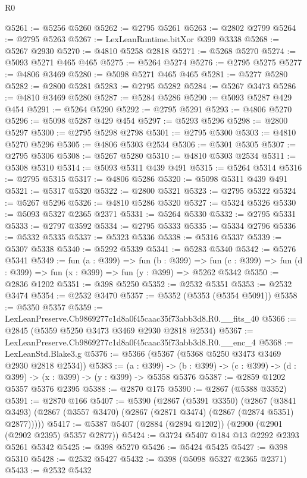 \begin{lexlean}{R0}
\begin{coremodule}
@5261 := @5256 @5260
@5262 := @2795 @5261
@5263 := @2802 @2799
@5264 := @2795 @5263
@5267 := LexLeanRuntime.bitXor @399 @3338
@5268 := @5267 @2930
@5270 := @4810 @5258 @2818
@5271 := @5268 @5270
@5274 := @5093 @5271 @465 @465
@5275 := @5264 @5274
@5276 := @2795 @5275
@5277 := @4806 @3469
@5280 := @5098 @5271 @465 @465
@5281 := @5277 @5280
@5282 := @2800 @5281
@5283 := @2795 @5282
@5284 := @5267 @3473
@5286 := @4810 @3469 @5280
@5287 := @5284 @5286
@5290 := @5093 @5287 @429 @454
@5291 := @5264 @5290
@5292 := @2795 @5291
@5293 := @4806 @5270
@5296 := @5098 @5287 @429 @454
@5297 := @5293 @5296
@5298 := @2800 @5297
@5300 := @2795 @5298 @2798
@5301 := @2795 @5300
@5303 := @4810 @5270 @5296
@5305 := @4806 @5303 @2534
@5306 := @5301 @5305
@5307 := @2795 @5306
@5308 := @5267 @5280
@5310 := @4810 @5303 @2534
@5311 := @5308 @5310
@5314 := @5093 @5311 @439 @491
@5315 := @5264 @5314
@5316 := @2795 @5315
@5317 := @4806 @5286
@5320 := @5098 @5311 @439 @491
@5321 := @5317 @5320
@5322 := @2800 @5321
@5323 := @2795 @5322
@5324 := @5267 @5296
@5326 := @4810 @5286 @5320
@5327 := @5324 @5326
@5330 := @5093 @5327 @2365 @2371
@5331 := @5264 @5330
@5332 := @2795 @5331
@5333 := @2797 @3592
@5334 := @2795 @5333
@5335 := @5334 @2796
@5336 := @5332 @5335
@5337 := @5323 @5336
@5338 := @5316 @5337
@5339 := @5307 @5338
@5340 := @5292 @5339
@5341 := @5283 @5340
@5342 := @5276 @5341
@5349 := fun (a : @399) =>
  fun (b : @399) =>
  fun (c : @399) => fun (d : @399) => fun (x : @399) => fun (y : @399) => @5262 @5342
@5350 := @2836 @1202
@5351 := @398 @5250
@5352 := @2532 @5351
@5353 := @2532 @3474
@5354 := @2532 @3470
@5357 := @5352 (@5353 (@5354 @5091))
@5358 := @5350 @5357
@5359 := LexLeanPreserve.Cb9869277c1d8a0f45caac35f73abb3d8.R0.__fits_40
@5366 := @2845 (@5359 @5250 @3473 @3469 @2930 @2818 @2534)
@5367 := LexLeanPreserve.Cb9869277c1d8a0f45caac35f73abb3d8.R0.__enc_4
@5368 := LexLeanStd.Blake3.g
@5376 := @5366 (@5367 (@5368 @5250 @3473 @3469 @2930 @2818 @2534))
@5383 := (a : @399) ->
  (b : @399) -> (c : @399) -> (d : @399) -> (x : @399) -> (y : @399) -> @5358 @5376
@5387 := @2859 @1202 @5357 @5376 @2395
@5388 := @2870 @175
@5390 := @2867 (@5388 @3352)
@5391 := @2870 @166
@5407 := @5390
    (@2867
      (@5391 @3350)
      (@2867 (@3841 @3493) (@2867 (@3557 @3470) (@2867 (@2871 @3474) (@2867 (@2874 @5351) @2877)))))
@5417 := @5387 @5407 (@2884 (@2894 @1202)) (@2900 (@2901 (@2902 @2395) @5357 @2877))
@5424 := @3724 @5407 @184 @13 @2292 @2393 @5261 @5342
@5425 := @398 @5270
@5426 := @5424 @5425
@5427 := @398 @5310
@5428 := @2532 @5427
@5432 := @398 (@5098 @5327 @2365 @2371)
@5433 := @2532 @5432

\end{coremodule}
\end{lexlean}
